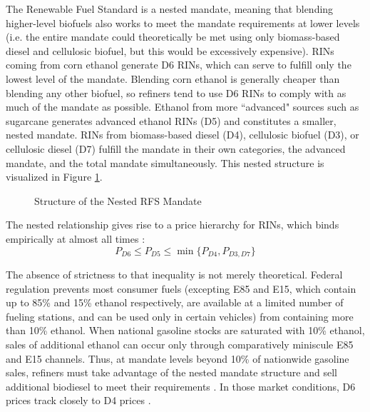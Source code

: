 \documentclass[11pt]{article}
\begin{document}
The Renewable Fuel Standard is a nested mandate, meaning that blending higher-level biofuels also works to meet the mandate requirements at lower levels (i.e. the entire mandate could theoretically be met using only biomass-based diesel and cellulosic biofuel, but this would be excessively expensive). RINs coming from corn ethanol generate D6 RINs, which can serve to fulfill only the lowest level of the mandate. Blending corn ethanol is generally cheaper than blending any other biofuel, so refiners tend to use D6 RINs to comply with as much of the mandate as possible. Ethanol from more ``advanced" sources such as sugarcane generates advanced ethanol RINs (D5) and constitutes a smaller, nested mandate. RINs from biomass-based diesel (D4), cellulosic biofuel (D3), or cellulosic diesel (D7) fulfill the mandate in their own categories, the advanced mandate, and the total mandate simultaneously. This nested structure is visualized in Figure \ref{RINstructure}.

\begin{figure}[h]
	\caption{Structure of the Nested RFS Mandate}
	\label{RINstructure}
	\centering
\end{figure}
The nested relationship gives rise to a price hierarchy for RINs, which binds empirically at almost all times \citep{Whistance2014}:
$$P_{D6}\le P_{D5} \le \min \{P_{D4}, P_{D3,D7}\}$$

The absence of strictness to that inequality is not merely theoretical. Federal regulation prevents most consumer fuels (excepting E85 and E15, which contain up to 85\% and 15\% ethanol respectively, are available at a limited number of fueling stations, and can be used only in certain vehicles) from containing more than 10\% ethanol. When national gasoline stocks are saturated with 10\% ethanol, sales of additional ethanol can occur only through comparatively miniscule E85 and E15 channels. Thus, at mandate levels beyond 10\% of nationwide gasoline sales, refiners must take advantage of the nested mandate structure and sell additional biodiesel to meet their requirements \citep{Korting2019}. In those market conditions, D6 prices track closely to D4 prices \citep{Irwin2014}.
\end{document}
